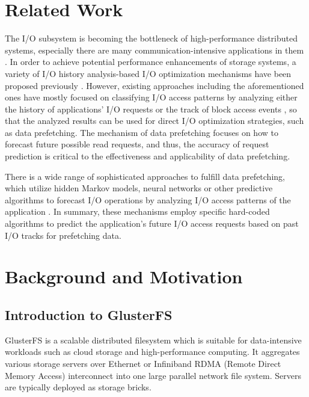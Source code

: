 \documentclass[conference]{IEEEtran}
\begin{document}
\section{Related Work}
The I/O subsystem is becoming the bottleneck of high-performance distributed systems, especially there are many communication-intensive applications in them \cite{Related_Network_I/O_load_based}. In order to achieve potential performance enhancements of storage systems, a variety of I/O history analysis-based I/O optimization mechanisms have been proposed previously 
\cite{Related_Multi_Layer_Event_Trace_Analysis} \cite{Related_Towards_an_I/O_tracing_framework_taxonomy} \cite{Related_DiskSeen} \cite{A_Prefetching_Scheme_Related} \cite{Scalable_IO_Tracing_Related}. However, existing approaches including the aforementioned ones have mostly focused on classifying I/O access patterns by analyzing either the history of applications’ I/O requests
\cite{Parallel_IO_Prefetching_Related} \cite{Learning_To_Classify_Related} or the track of block access events \cite{Related_DiskSeen} \cite{A_Prefetching_Scheme_Related}, so that the analyzed results can be used for direct I/O optimization strategies, such as data prefetching. The mechanism of data prefetching focuses on how to forecast future possible read requests, and thus, the accuracy of request prediction is critical to the effectiveness and applicability of data prefetching.

There is a wide range of sophisticated approaches to fulfill data prefetching, which utilize hidden Markov models, neural networks or other predictive algorithms to forecast I/O operations by analyzing I/O access patterns of the application 
\cite{Parallel_IO_Prefetching_Related} \cite{IO_Acceleration_with_Related} \cite{An_Automatic_Prefetching_Related} \cite{Reducing_File_System_Latency_Related} \cite{Automatic_ARIMA_Related}. In summary, these mechanisms employ specific hard-coded algorithms to predict the application's future I/O access requests based on past I/O tracks for prefetching data.

\section{Background and Motivation}
\subsection{Introduction to GlusterFS}
GlusterFS is a scalable distributed filesystem which is suitable for data-intensive workloads such as cloud storage and high-performance computing. It aggregates various storage servers over Ethernet or Infiniband RDMA (Remote Direct Memory Access) interconnect into one large parallel network file system. Servers are typically deployed as storage bricks.
\end{document}
